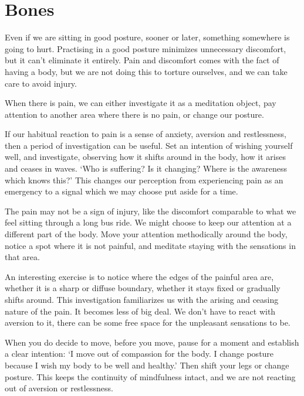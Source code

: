 \chapter{Bones}


Even if we are sitting in good posture, sooner or later, something
somewhere is going to hurt. Practising in a good posture minimizes
unnecessary discomfort, but it can't eliminate it entirely. Pain and
discomfort comes with the fact of having a body, but we are not doing
this to torture ourselves, and we can take care to avoid injury.

When there is pain, we can either investigate it as a meditation object,
pay attention to another area where there is no pain, or change our
posture.

If our habitual reaction to pain is a sense of anxiety, aversion and
restlessness, then a period of investigation can be useful. Set an
intention of wishing yourself well, and investigate, observing how it
shifts around in the body, how it arises and ceases in waves. `Who is
suffering? Is it changing? Where is the awareness which knows this?'
This changes our perception from experiencing pain as an emergency to a
signal which we may choose put aside for a time.

The pain may not be a sign of injury, like the discomfort comparable to
what we feel sitting through a long bus ride. We might choose to keep
our attention at a different part of the body. Move your attention
methodically around the body, notice a spot where it is not painful, and
meditate staying with the sensations in that area.

An interesting exercise is to notice where the edges of the painful area
are, whether it is a sharp or diffuse boundary, whether it stays fixed
or gradually shifts around. This investigation familiarizes us with the
arising and ceasing nature of the pain. It becomes less of big deal. We
don't have to react with aversion to it, there can be some free space
for the unpleasant sensations to be.

When you do decide to move, before you move, pause for a moment and
establish a clear intention: `I move out of compassion for the body. I
change posture because I wish my body to be well and healthy.' Then
shift your legs or change posture. This keeps the continuity of
mindfulness intact, and we are not reacting out of aversion or
restlessness.


